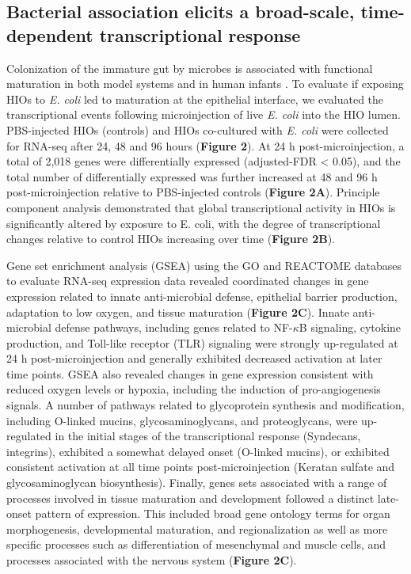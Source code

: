\documentclass[9pt,lineo]{elife}
\begin{document}
\subsection*{{\bfseries\sffamily } Bacterial association elicits a broad-scale, time-dependent transcriptional response}
\label{sec:orgheadline4}
Colonization of the immature gut by microbes is associated with functional maturation in both model systems\citep{Kremer:2013,Sommer:2015,Broderick:2014,Erkosar:2015} and in human infants \citep{Renz:2012}. To evaluate if exposing HIOs to \emph{E. coli} led to maturation at the epithelial interface, we evaluated the transcriptional events following microinjection of live \emph{E. coli}  into the HIO lumen. PBS-injected HIOs (controls) and HIOs co-cultured with \emph{E. coli} were collected for RNA-seq after 24, 48 and 96 hours (\textbf{Figure 2}). At 24 h post-microinjection, a total of 2,018 genes were differentially expressed (adjusted-FDR < 0.05), and the total number of differentially expressed was further increased at 48 and 96 h post-microinjection relative to PBS-injected controls (\textbf{Figure 2A}). Principle component analysis demonstrated that global transcriptional activity in HIOs is significantly altered by exposure to E. coli, with the degree of transcriptional changes relative to control HIOs increasing over time (\textbf{Figure 2B}).

Gene set enrichment analysis (GSEA) \citep{Subramanian:2005} using the GO \citep{Ashburner:2000,Gene_Ontology_Consortium:2015} and REACTOME \citep{Croft:2014,Fabregat:2016} databases to evaluate RNA-seq expression data revealed coordinated changes in gene expression related to innate anti-microbial defense, epithelial barrier production, adaptation to low oxygen, and tissue maturation (\textbf{Figure 2C}). Innate anti-microbial defense pathways, including genes related to NF-\(\kappa\)B signaling, cytokine production, and Toll-like receptor (TLR) signaling were strongly up-regulated at 24 h post-microinjection and generally exhibited decreased activation at later time points. GSEA also revealed changes in gene expression consistent with reduced oxygen levels or hypoxia, including the induction of pro-angiogenesis signals. A number of pathways related to glycoprotein synthesis and modification, including O-linked mucins, glycosaminoglycans, and proteoglycans, were up-regulated in the initial stages of the transcriptional response (Syndecans, integrins), exhibited a somewhat delayed onset (O-linked mucins), or exhibited consistent activation at all time points post-microinjection (Keratan sulfate and glycosaminoglycan biosynthesis). Finally, genes sets associated with a range of processes involved in tissue maturation and development followed a distinct late-onset pattern of expression. This included broad gene ontology terms for organ morphogenesis, developmental maturation, and regionalization as well as more specific processes such as differentiation of mesenchymal and muscle cells, and processes associated with the nervous system (\textbf{Figure 2C}).
\end{document}
